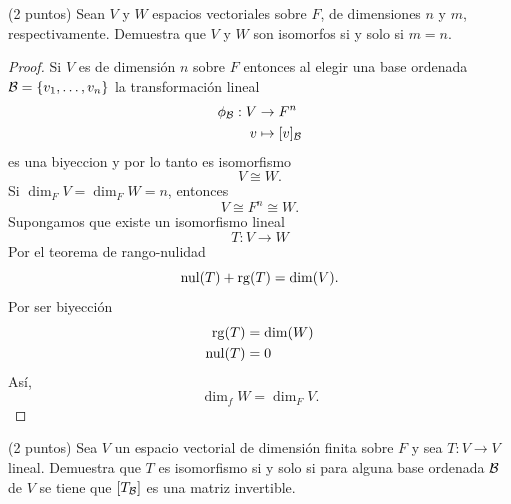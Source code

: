 \documentclass[12pt,a4paper]{article}
\begin{document}
    \begin{mdframed}[style=mdpinkbox,frametitle={Ejercicio 5}]
        (2 puntos) Sean $V$ y $W$ espacios vectoriales sobre $F$, de dimensiones $n$ y $m$, respectivamente.
        Demuestra que $V$ y $W$ son isomorfos si y solo si $m=n$.
    \end{mdframed}

    \begin{proof}
        Si $V$ es de dimensión $n$ sobre $F$ entonces al elegir una base ordenada $\mathcal{B}=\{v_{1},\dots,v_{n}\}$
        la transformación lineal
        \begin{align*}
            \phi_{\mathcal{B}}:V&\to F^{n}\\
            v&\mapsto[v]_{\mathcal{B}}
        \end{align*}
        es una biyeccion y por lo tanto es isomorfismo
        \begin{equation*}
            V\cong W.
        \end{equation*}
        Si $\dim_{F}V=\dim_{F}W=n$, entonces
        \begin{equation*}
            V\cong F^{n}\cong W.
        \end{equation*}
        Supongamos que existe un isomorfismo lineal
        \begin{equation*}
            T:V\to W
        \end{equation*}
        Por el teorema de rango-nulidad
        \begin{equation*}
            \operatorname{nul}(T)+\operatorname{rg}(T)=\dim(V).
        \end{equation*}
        Por ser biyección
        \begin{align*}
            \operatorname{rg}(T)&=\dim(W)\\
            \operatorname{nul}(T)&=0
        \end{align*}
        Así,
        \begin{equation*}
            \dim_{f}W=\dim_{F}V.
        \end{equation*}
    \end{proof}

    \begin{mdframed}[style=mdpinkbox,frametitle={Ejercicio 6}]
        (2 puntos) Sea $V$ un espacio vectorial de dimensión finita sobre $F$ y sea $T:V\to V$
        lineal. Demuestra que $T$ es isomorfismo si y solo si para alguna base ordenada $\mathcal{B}$
        de $V$ se tiene que $[T_{\mathcal{B}}]$ es una matriz invertible.
    \end{mdframed}
\end{document}
